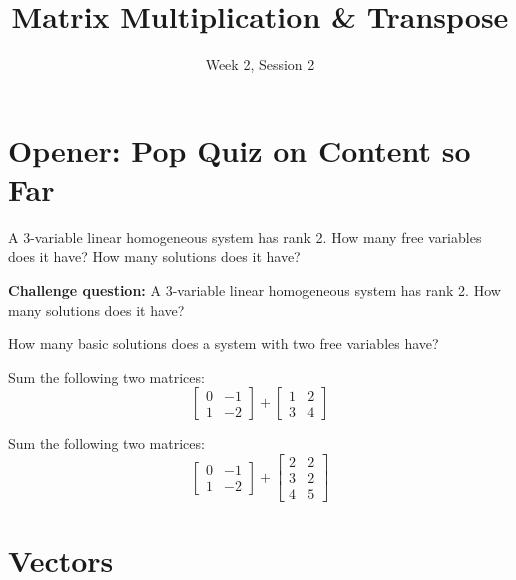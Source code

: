 \documentclass[11pt]{exam}
\title{Matrix Multiplication \& Transpose}
\date{Week 2, Session 2}
\begin{document}
\maketitle

\section{Opener: Pop Quiz on Content so Far}
    \begin{questions}
        \item A 3-variable linear homogeneous system has rank 2. How many free variables does it have? How many solutions does it have?
        \item \textbf{Challenge question: } A 3-variable linear homogeneous system has rank 2. How many solutions does it have?
        \item How many basic solutions does a system with two free variables have?
        \item Sum the following two matrices:
        $$\begin{bmatrix} 0 & -1 \\ 1 & -2 \end{bmatrix} + \begin{bmatrix} 1 & 2 \\ 3 & 4 \end{bmatrix}$$
        \item Sum the following two matrices:
        $$\begin{bmatrix} 0 & -1 \\ 1 & -2 \end{bmatrix} + \begin{bmatrix} 2 & 2 \\ 3 & 2 \\ 4 & 5\end{bmatrix}$$
    \end{questions}

\pagebreak
\section{Vectors}
    
    \vspace{20px}
\end{document}
